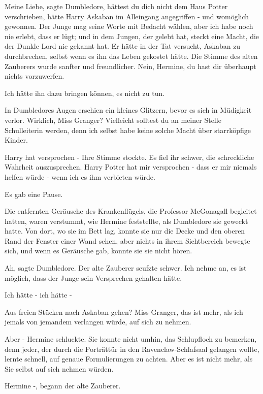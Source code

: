 \glqq Meine Liebe\grqq{}, sagte Dumbledore, \glqq hättest du dich nicht dem Haus
Potter verschrieben, hätte Harry Askaban im Alleingang angegriffen - und
womöglich gewonnen. Der Junge mag seine Worte mit Bedacht wählen, aber ich habe
noch nie erlebt, dass er lügt; und in dem Jungen, der gelebt hat, steckt eine
Macht, die der Dunkle Lord nie gekannt hat. Er hätte in der Tat versucht,
Askaban zu durchbrechen, selbst wenn es ihn das Leben gekostet hätte.\grqq{} Die
Stimme des alten Zauberers wurde sanfter und freundlicher. \glqq Nein, Hermine,
du hast dir überhaupt nichts vorzuwerfen.\grqq{}

\glqq Ich hätte ihn dazu bringen können, es nicht zu tun.\grqq{}

In Dumbledores Augen erschien ein kleines Glitzern, bevor es sich in Müdigkeit
verlor. \glqq Wirklich, Miss Granger? Vielleicht solltest du an meiner Stelle
Schulleiterin werden, denn ich selbst habe keine solche Macht über starrköpfige
Kinder.\grqq{}

\glqq Harry hat versprochen -\grqq{} Ihre Stimme stockte. Es fiel ihr schwer,
die schreckliche Wahrheit auszusprechen. \glqq Harry Potter hat mir versprochen
- dass er mir niemals helfen würde - wenn ich es ihm verbieten würde.\grqq{}

Es gab eine Pause.

Die entfernten Geräusche des Krankenflügels, die Professor McGonagall begleitet
hatten, waren verstummt, wie Hermine feststellte, als Dumbledore sie geweckt
hatte. Von dort, wo sie im Bett lag, konnte sie nur die Decke und den oberen
Rand der Fenster einer Wand sehen, aber nichts in ihrem Sichtbereich bewegte
sich, und wenn es Geräusche gab, konnte sie sie nicht hören.

\glqq Ah\grqq{}, sagte Dumbledore. Der alte Zauberer seufzte schwer. \glqq Ich
nehme an, es ist möglich, dass der Junge sein Versprechen gehalten hätte.\grqq{}

\glqq Ich hätte - ich hätte -\grqq{}

\glqq Aus freien Stücken nach Askaban gehen? Miss Granger, das ist mehr, als ich
jemals von jemandem verlangen würde, auf sich zu nehmen.\grqq{}

\glqq Aber -\grqq{} Hermine schluckte. Sie konnte nicht umhin, das Schlupfloch
zu bemerken, denn jeder, der durch die Porträttür in den Ravenclaw-Schlafsaal
gelangen wollte, lernte schnell, auf genaue Formulierungen zu achten. \glqq Aber
es ist nicht mehr, als Sie selbst auf sich nehmen würden.\grqq{}

\glqq Hermine -\grqq{}, begann der alte Zauberer.

